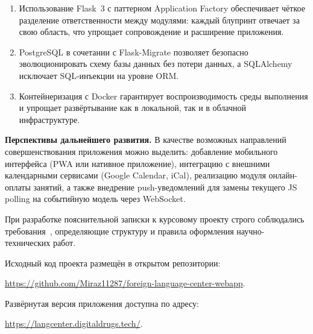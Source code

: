 \begin{enumerate}
    \item Использование Flask~3 с паттерном Application Factory обеспечивает
    чёткое разделение ответственности между модулями: каждый блупринт
    отвечает за свою область, что упрощает сопровождение и расширение
    приложения.
    \item PostgreSQL в сочетании с Flask-Migrate
    позволяет безопасно эволюционировать схему базы данных без потери
    данных, а SQLAlchemy исключает SQL-инъекции
    на уровне ORM.
    \item Контейнеризация с Docker гарантирует
    воспроизводимость среды выполнения и упрощает развёртывание
    как в локальной, так и в облачной инфраструктуре.
\end{enumerate}

\textbf{Перспективы дальнейшего развития.} В качестве возможных направлений
совершенствования приложения можно выделить: добавление мобильного
интерфейса (PWA или нативное приложение), интеграцию с внешними
календарными сервисами (Google Calendar, iCal), реализацию модуля
онлайн-оплаты занятий, а также внедрение push-уведомлений для замены
текущего JS polling на событийную модель через WebSocket.

При разработке пояснительной записки к курсовому проекту строго
соблюдались требования~\cite{gost_report}, определяющие структуру
и правила оформления научно-технических работ.

Исходный код проекта размещён в открытом репозитории:
\begin{center}
    \url{https://github.com/Miraz11287/foreign-language-center-webapp}.
\end{center}

Развёрнутая версия приложения доступна по адресу:
\begin{center}
    \url{https://langcenter.digitaldrugs.tech/}.
\end{center}
